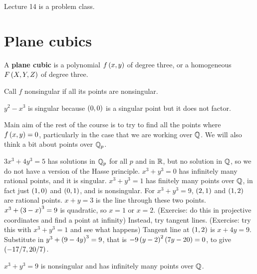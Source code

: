 
Lecture 14 is a problem class.

\pagebreak

\section{Plane cubics}


\begin{definition}
A \textbf{plane cubic} is a polynomial $ f\left( x, y \right) $ of degree three, or a homogeneous $ F\left( X, Y, Z \right) $ of degree three.
\end{definition}

Call $ f $ nonsingular if all its points are nonsingular.

\begin{example*}
$ y^2 - x^3 $ is singular because $ \left( 0, 0 \right) $ is a singular point but it does not factor.
\end{example*}

Main aim of the rest of the course is to try to find all the points where $ f\left( x, y \right) = 0 $, particularly in the case that we are working over $ \mathbb{Q} $. We will also think a bit about points over $ \mathbb{Q}_p $.

\begin{example*}
$ 3x^3 + 4y^3 = 5 $ has solutions in $ \mathbb{Q}_p $ for all $ p $ and in $ \mathbb{R} $, but no solution in $ \mathbb{Q} $, so we do not have a version of the Hasse principle. $ x^3 + y^3 = 0 $ has infinitely many rational points, and it is singular. $ x^3 + y^3 = 1 $ has finitely many points over $ \mathbb{Q} $, in fact just $ \left( 1, 0 \right) $ and $ \left( 0, 1 \right) $, and is nonsingular. For $ x^3 + y^3 = 9 $, $ \left( 2, 1 \right) $ and $ \left( 1, 2 \right) $ are rational points. $ x + y = 3 $ is the line through these two points. $ x^3 + \left( 3 - x \right)^3 = 9 $ is quadratic, so $ x = 1 $ or $ x = 2 $. (Exercise: do this in projective coordinates and find a point at infinity) Instead, try tangent lines. (Exercise: try this with $ x^3 + y^3 = 1 $ and see what happens) Tangent line at $ \left( 1, 2 \right) $ is $ x + 4y = 9 $. Substitute in $ y^3 + \left( 9 - 4y \right)^3 = 9 $, that is $ -9\left( y - 2 \right)^2\left( 7y - 20 \right) = 0 $, to give $ \left( -17 / 7, 20 / 7 \right) $.
\end{example*}

\begin{lemma}
$ x^3 + y^3 = 9 $ is nonsingular and has infinitely many points over $ \mathbb{Q} $.
\end{lemma}

